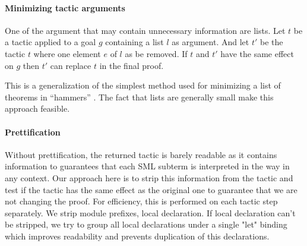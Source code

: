 \documentclass[runningheads,a4paper,draft]{svjour3}
\def\sml{\textsf{SML}\xspace}
\begin{document}
\paragraph{Minimizing tactic arguments}
One of the argument that may contain unnecessary information are lists.
Let $t$ be a tactic applied to a goal $g$ containing a list $l$ as argument. 
And let $t'$ be the tactic $t$ where one element $e$ of $l$ as be removed. If 
$t$ and $t'$ have the same effect on $g$ then $t'$ can replace $t$ in the final 
proof.

This is a generalization of the simplest method used for minimizing a list of 
theorems in ``hammers'' \cite{}. The fact that lists are generally small
make this approach feasible.

\paragraph{Prettification}
Without prettification, the returned tactic is barely readable as it contains 
information to guarantees that each \sml subterm is interpreted in the way in 
any context. Our approach here is to strip this information from the tactic and 
test if the tactic has the same effect as the original one to guarantee that we 
are not changing the proof. For efficiency, 
this is performed on each tactic step separately. We strip module prefixes, 
local declaration. If local declaration can't be 
stripped, we try to group all local declarations under a single "let" binding 
which improves readability and prevents duplication of this declarations.


\end{document}
